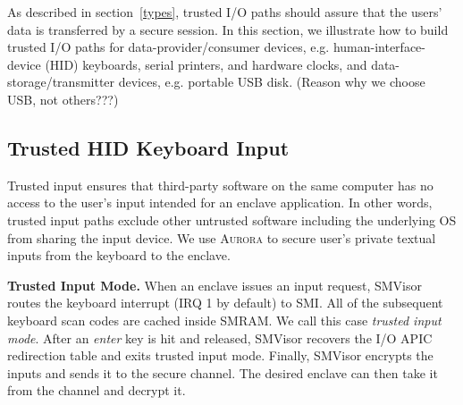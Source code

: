 As described in section~\autoref{types},  trusted I/O paths  should assure that the users' data is transferred by a secure session. 
In this section, we illustrate how to build trusted I/O paths for data-provider/consumer devices, e.g. human-interface-device (HID) keyboards, serial printers, and hardware clocks, and data-storage/transmitter devices, e.g. portable USB disk. (Reason why we choose USB, not others???)

\subsection{Trusted HID Keyboard Input}\label{input_service}
Trusted input ensures that third-party software on the same computer has no access to the user's input intended for an enclave application. In other words, trusted input paths exclude other untrusted software including the underlying OS from sharing the input device. We use \textsc{Aurora} to secure user's private textual inputs from the keyboard to the enclave.%

\textbf{Trusted Input Mode.}
When an enclave issues an input request, SMVisor routes the keyboard interrupt (IRQ 1 by default) to SMI. All of the subsequent keyboard scan codes are cached inside SMRAM. We call this case \emph{trusted input mode}. After an \emph{enter} key is hit and released, SMVisor recovers the I/O APIC redirection table and exits trusted input mode. Finally, SMVisor encrypts the inputs and sends it to the secure channel. The desired enclave can then take it from the channel and decrypt it. %

